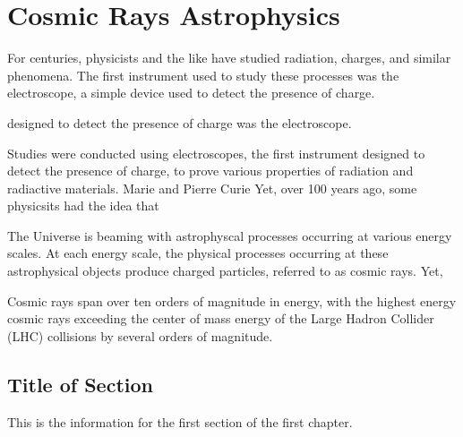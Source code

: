 %
%
\chapter{Cosmic Rays Astrophysics}
For centuries, physicists and the like have studied radiation, charges, and similar phenomena.
The first instrument used to study these processes was the electroscope, a simple device used to detect the presence of charge.


designed to detect the presence of charge was the electroscope.

Studies were conducted using electroscopes, the first instrument designed to detect the presence of charge, to prove various properties of radiation and radiactive materials.
Marie and Pierre Curie 
Yet, over 100 years ago, some physicsits had the idea that 

The Universe is beaming with astrophyscal processes occurring at various energy scales.
At each energy scale, the physical processes occurring at these astrophysical objects produce charged particles, referred to as cosmic rays.
Yet, 




Cosmic rays span over ten orders of magnitude in energy, with the highest energy cosmic rays exceeding the center of mass energy of the Large Hadron Collider (LHC) collisions by several orders of magnitude.



\section{Title of Section}

This is the information for the first section of the first chapter.